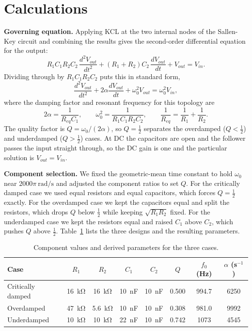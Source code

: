 \documentclass[11pt]{article}
\begin{document}
\section*{Calculations}

\textbf{Governing equation.} Applying KCL at the two internal nodes of the
Sallen-Key circuit and combining the results gives the second-order differential
equation for the output:
\[
    R_1 C_1 R_2 C_2 \, \frac{d^2 V_{out}}{dt^2}
    + (R_1 + R_2) C_2 \, \frac{d V_{out}}{dt}
    + V_{out} = V_{in}.
\]
Dividing through by $R_1 C_1 R_2 C_2$ puts this in standard form,
\[
    \frac{d^2 V_{out}}{dt^2} + 2\alpha \frac{d V_{out}}{dt} + \omega_0^2 V_{out}
    = \omega_0^2 V_{in},
\]
where the damping factor and resonant frequency for this topology are
\[
    2\alpha = \frac{1}{R_{eq} C_1}, \qquad
    \omega_0^2 = \frac{1}{R_1 C_1 R_2 C_2}, \qquad
    \frac{1}{R_{eq}} = \frac{1}{R_1} + \frac{1}{R_2}.
\]
The quality factor is $Q = \omega_0 / (2\alpha)$, so $Q = \tfrac{1}{2}$ separates
the overdamped ($Q < \tfrac{1}{2}$) and underdamped ($Q > \tfrac{1}{2}$) cases.
At DC the capacitors are open and the follower passes the input straight through,
so the DC gain is one and the particular solution is $V_{out} = V_{in}$.

\textbf{Component selection.} We fixed the geometric-mean time constant to hold
$\omega_0$ near $2000\pi\ \si{\radian\per\second}$ and adjusted the component
ratios to set $Q$. For the critically damped case we used equal resistors and
equal capacitors, which forces $Q = \tfrac{1}{2}$ exactly. For the overdamped
case we kept the capacitors equal and split the resistors, which drops $Q$ below
$\tfrac{1}{2}$ while keeping $\sqrt{R_1 R_2}$ fixed. For the underdamped case we
kept the resistors equal and raised $C_1$ above $C_2$, which pushes $Q$ above
$\tfrac{1}{2}$. Table~\ref{tab:design} lists the three designs and the resulting
parameters.

\begin{table}[H]
    \centering
    \caption{Component values and derived parameters for the three cases.}
    \label{tab:design}
    \begin{tabular}{lccccccc}
        \toprule
        Case & $R_1$ & $R_2$ & $C_1$ & $C_2$ & $Q$ & $f_0$ (Hz) & $\alpha$ (s$^{-1}$) \\
        \midrule
        Critically damped & \SI{16}{\kilo\ohm} & \SI{16}{\kilo\ohm} & \SI{10}{\nano\farad} & \SI{10}{\nano\farad} & 0.500 & 994.7 & 6250 \\
        Overdamped        & \SI{47}{\kilo\ohm} & \SI{5.6}{\kilo\ohm} & \SI{10}{\nano\farad} & \SI{10}{\nano\farad} & 0.308 & 981.0 & 9992 \\
        Underdamped       & \SI{10}{\kilo\ohm} & \SI{10}{\kilo\ohm} & \SI{22}{\nano\farad} & \SI{10}{\nano\farad} & 0.742 & 1073 & 4545 \\
        \bottomrule
    \end{tabular}
\end{table}
\end{document}
